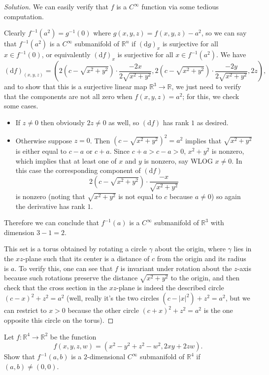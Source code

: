 \documentclass[10pt]{scrartcl}
\providecommand{\RR}{\mathbb R}
\providecommand{\ii}{\item}
\providecommand{\inv}{^{-1}}
\newenvironment{soln}{\begin{proof}[Solution]}{\end{proof}}
\begin{document}
\begin{soln}
	We can easily verify that $f$ is a $C^\infty$ function
	via some tedious computation.
	
	Clearly $f\inv(a^2) = g\inv(0)$ where $g(x,y,z) = f(x,y,z)-a^2$,
	so we can say that $f\inv(a^2)$ is a $C^\infty$ submanifold of $\RR^n$ if
	$(\mathrm dg)_x$ is surjective for all $x\in f\inv(0)$,
	or equivalently $(\mathrm df)_x$ is surjective for all $x\in f\inv(a^2)$.
	We have
	\[(\mathrm df)_{(x,y,z)} = \left(
	2(c-\sqrt{x^2+y^2})\cdot\frac{-2x}{2\sqrt{x^2+y^2}},
	2(c-\sqrt{x^2+y^2})\cdot\frac{-2y}{2\sqrt{x^2+y^2}},
	2z\right),\]
	and to show that this is a surjective linear map $\RR^3\to\RR$,
	we just need to verify that the components are not all zero
	when $f(x,y,z) = a^2$; for this, we check some cases.
	\begin{itemize}
		\ii If $z\ne 0$ then obviously $2z\ne 0$ as well,
		so $(\mathrm df)$ has rank $1$ as desired.
		\ii Otherwise suppose $z =0$. Then $(c-\sqrt{x^2+y^2})^2 = a^2$
		implies that $\sqrt{x^2+y^2}$ is either equal to $c-a$ or $c+a$.
		Since $c+a>c-a>0$, $x^2+y^2$ is nonzero, which implies that
		at least one of $x$ and $y$ is nonzero, say WLOG $x\ne0$.
		In this case the corresponding component of $(\mathrm df)$
		\[2(c-\sqrt{x^2+y^2})\cdot\frac{-x}{\sqrt{x^2+y^2}}\]
		is nonzero (noting that $\sqrt{x^2+y^2}$ is not equal to $c$
		because $a\ne0$) so again the derivative has rank $1$.
	\end{itemize}
	Therefore we can conclude that $f\inv(a)$ is a $C^\infty$
	submanifold of $\RR^3$ with dimension $3-1=2$.
	
	This set is a torus obtained by
	rotating a circle $\gamma$ about the origin,
	where $\gamma$ lies in the $xz$-plane such that
	its center is a distance of $c$ from the origin
	and its radius is $a$. To verify this, one can see that
	$f$ is invariant under rotation about the $z$-axis
	because such rotations preserve
	the distance $\sqrt{x^2+y^2}$ to the origin,
	and then check that the cross section in the $xz$-plane
	is indeed the described circle $(c-x)^2 + z^2 = a^2$
	(well, really it's the two circles $(c-|x|^2)+z^2=a^2$,
	but we can restrict to $x>0$ because the other circle
	$(c+x)^2+z^2=a^2$ is the one opposite this circle on the torus).
\end{soln}

\begin{problem}
	Let $f\colon\RR^4\to\RR^2$ be the function
	\[f(x,y,z,w) = (x^2-y^2+z^2-w^2, 2xy+2zw).\]
	Show that $f\inv(a,b)$ is a $2$-dimensional $C^\infty$
	submanifold of $\RR^4$ if $(a,b)\ne(0,0)$.
\end{problem}
\end{document}
